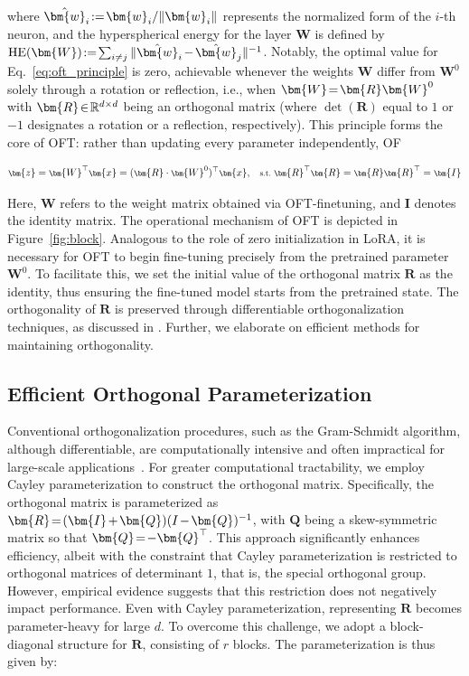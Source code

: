 where $\thickmuskip=2mu \medmuskip=2mu \hat{\bm{w}}_i:=\bm{w}_i/\|\bm{w}_i\|$ represents the normalized form of the $i$-th neuron, and the hyperspherical energy for the layer $\bm{W}$ is defined by $\thickmuskip=2mu \medmuskip=2mu \text{HE}(\bm{W}):= \sum_{i\neq j} \|\hat{\bm{w}}_i-\hat{\bm{w}}_j\|^{-1}$. Notably, the optimal value for Eq.~\eqref{eq:oft_principle} is zero, achievable whenever the weights $\bm{W}$ differ from $\bm{W}^0$ solely through a rotation or reflection, i.e., when $\thickmuskip=2mu \medmuskip=2mu \bm{W}=\bm{R}\bm{W}^0$ with $\thickmuskip=2mu \medmuskip=2mu \bm{R}\in\mathbb{R}^{d\times d}$ being an orthogonal matrix (where $\det(\bm{R})$ equal to $1$ or $-1$ designates a rotation or a reflection, respectively). This principle forms the core of OFT: rather than updating every parameter independently, OF

\begin{equation}\label{eq:oft_general}
    \footnotesize
    \bm{z}=\bm{W}^\top\bm{x}=(\bm{R}\cdot\bm{W}^0)^\top\bm{x},~~~\text{s.t.}~\bm{R}^\top\bm{R}=\bm{R}\bm{R}^\top=\bm{I}
\end{equation}

Here, $\bm{W}$ refers to the weight matrix obtained via OFT-finetuning, and $\bm{I}$ denotes the identity matrix. The operational mechanism of OFT is depicted in Figure~\ref{fig:block}. Analogous to the role of zero initialization in LoRA, it is necessary for OFT to begin fine-tuning precisely from the pretrained parameter $\bm{W}^0$. To facilitate this, we set the initial value of the orthogonal matrix $\bm{R}$ as the identity, thus ensuring the fine-tuned model starts from the pretrained state. The orthogonality of $\bm{R}$ is preserved through differentiable orthogonalization techniques, as discussed in \cite{liu2021orthogonal,lezcano2019cheap}. Further, we elaborate on efficient methods for maintaining orthogonality.

\subsection{Efficient Orthogonal Parameterization}\label{sect:eff_ortho}

Conventional orthogonalization procedures, such as the Gram-Schmidt algorithm, although differentiable, are computationally intensive and often impractical for large-scale applications~\cite{liu2021orthogonal}. For greater computational tractability, we employ Cayley parameterization to construct the orthogonal matrix. Specifically, the orthogonal matrix is parameterized as $\thickmuskip=2mu \medmuskip=2mu \bm{R}=(\bm{I}+\bm{Q})(I-\bm{Q})^{-1}$, with $\bm{Q}$ being a skew-symmetric matrix so that $\thickmuskip=2mu \medmuskip=2mu \bm{Q}=-\bm{Q}^\top$. This approach significantly enhances efficiency, albeit with the constraint that Cayley parameterization is restricted to orthogonal matrices of determinant $1$, that is, the special orthogonal group. However, empirical evidence suggests that this restriction does not negatively impact performance. Even with Cayley parameterization, representing $\bm{R}$ becomes parameter-heavy for large $d$. To overcome this challenge, we adopt a block-diagonal structure for $\bm{R}$, consisting of $r$ blocks. The parameterization is thus given by:


